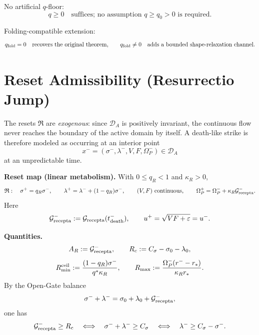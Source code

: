 \documentclass[11pt,a4paper]{article}
\newcommand{\DA}{\mathcal D_A}
\newcommand{\Grec}{\mathcal G_{\rm recepta}}
\newcommand{\Om}{\Omega_P}
\newcommand{\reset}{\mathfrak{R}}
\theoremstyle{plain}
\theoremstyle{definition}
\theoremstyle{remark}
\begin{document}
No artificial $q$-floor:
\begin{equation}
  q\ge0\quad\text{suffices; no assumption }q\ge q_0>0\text{ is required.}
\end{equation}

Folding-compatible extension:
\begin{equation}
  q_{\rm fold}=0\quad\text{recovers the original theorem,}
  \qquad
  q_{\rm fold}\ne0\quad\text{adds a bounded shape-relaxation channel.}
\end{equation}

\section{Reset Admissibility (Resurrectio Jump)}

The resets $\reset$ are \emph{exogenous}: since $\DA$ is positively invariant, the
continuous flow never reaches the boundary of the active domain by itself. A death-like
strike is therefore modeled as occurring at an interior point
\begin{equation}
  x^-=(\sigma^-,\lambda^-,V,F,\Om^-)\in\DA
\end{equation}
at an unpredictable time.

\textbf{Reset map (linear metabolism).} With $0\le q_R<1$ and $\kappa_R>0$,
\begin{equation}
  \reset:\quad
  \sigma^+=q_R\sigma^-,\qquad
  \lambda^+=\lambda^-+(1-q_R)\sigma^-,\qquad
  (V,F)\ \text{continuous},\qquad
  \Om^+=\Om^-+\kappa_R\Grec^-.
\end{equation}
Here
\begin{equation}
  \Grec^-:=\Grec(t_{\rm death}^-),
  \qquad
  u^+=\sqrt{VF+\varepsilon}=u^-.
\end{equation}

\textbf{Quantities.}
\begin{equation}
  A_R:=\Grec^-,\qquad
  R_c:=C_\sigma-\sigma_0-\lambda_0,
\end{equation}
\begin{equation}
  R_{\min}^{\rm ceil}:=
  \frac{(1-q_R)\sigma^-}{q^*\kappa_R},
  \qquad
  R_{\max}:=
  \frac{\Om^-(r^--r_*)}{\kappa_R r_*}.
\end{equation}
By the Open-Gate balance
\begin{equation}
  \sigma^-+\lambda^-=
  \sigma_0+\lambda_0+\Grec^-,
\end{equation}
one has
\begin{equation}
  \Grec^-\ge R_c
  \quad\Longleftrightarrow\quad
  \sigma^-+\lambda^-\ge C_\sigma
  \quad\Longleftrightarrow\quad
  \lambda^-\ge C_\sigma-\sigma^-.
\end{equation}
\end{document}
